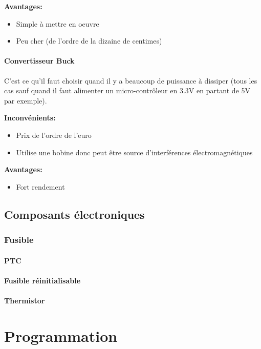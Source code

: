\documentclass[a4paper, 11pt]{report}
\begin{document}
\textbf{Avantages:}
\begin{itemize}
\item Simple à mettre en oeuvre
\item Peu cher (de l'ordre de la dizaine de centimes)
\end{itemize}


\subsection{Convertisseur Buck}
C'est ce qu'il faut choisir quand il y a beaucoup de puissance à dissiper (tous les cas sauf quand il faut alimenter un micro-contrôleur en 3.3V en partant de 5V par exemple).

\textbf{Inconvénients:}
\begin{itemize}
\item Prix de l'ordre de l'euro
\item Utilise une bobine donc peut être source d'interférences électromagnétiques
\end{itemize}

\textbf{Avantages:}
\begin{itemize}
\item Fort rendement
\end{itemize}

\chapter{Composants électroniques}

\section{Fusible}

\subsection{PTC}

\subsection{Fusible réinitialisable}

\subsection{Thermistor}

\part{Programmation}
\end{document}
